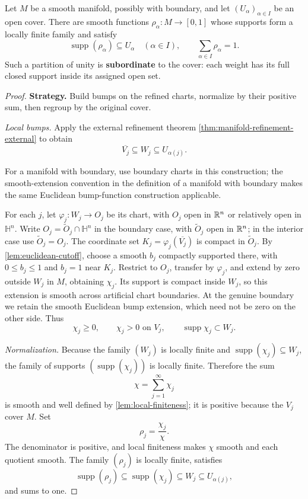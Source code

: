 \begin{theorem}
\label{thm:partition-unity}
Let $M$ be a smooth manifold, possibly with boundary, and let
$(U_\alpha)_{\alpha\in I}$ be an open cover. There are smooth functions
$\rho_\alpha:M\to[0,1]$ whose supports form a locally finite family and
satisfy
\[
\operatorname{supp}(\rho_\alpha)\subseteq U_\alpha
\quad(\alpha\in I),\qquad
\sum_{\alpha\in I}\rho_\alpha=1.
\]
Such a partition of unity is \textbf{subordinate} to the cover: each
weight has its full closed support inside its assigned open set.
\end{theorem}
\begin{proof}
\textbf{Strategy.} Build bumps on the refined charts, normalize by their
positive sum, then regroup by the original cover.

\emph{Local bumps.} Apply the external refinement theorem
\cref{thm:manifold-refinement-external} to obtain
\[
\overline{V_j}\subseteq W_j\subseteq U_{\alpha(j)}.
\]

For a manifold with boundary, use boundary charts in this construction; the
smooth-extension convention in the definition of a manifold with boundary
makes the same Euclidean bump-function construction applicable.

For each $j$, let $\varphi_j:W_j\to O_j$ be its chart, with $O_j$
open in $\mathbb{R}^n$ or relatively open in $\mathbb H^n$. Write
$O_j=\widetilde O_j\cap\mathbb H^n$ in the boundary case, with
$\widetilde O_j$ open in $\mathbb{R}^n$; in the interior case use $\widetilde O_j=O_j$.
The coordinate set $K_j=\varphi_j(\overline{V_j})$ is compact in
$\widetilde O_j$. By \cref{lem:euclidean-cutoff}, choose a smooth
$b_j$ compactly supported there, with $0\leq b_j\leq1$ and $b_j=1$
near $K_j$.
Restrict to $O_j$, transfer by $\varphi_j$, and extend by zero outside
$W_j$ in $M$, obtaining $\chi_j$. Its support is compact inside $W_j$,
so this extension is smooth across artificial chart boundaries. At the
genuine boundary we retain the smooth Euclidean bump extension, which need
not be zero on the other side. Thus
\[
\chi_j\geq0,\qquad\chi_j>0\text{ on }V_j,\qquad
\operatorname{supp}\chi_j\subset W_j.
\]

\emph{Normalization.} Because the family \((W_j)\) is locally finite and
\(\operatorname{supp}(\chi_j)\subseteq W_j\), the family of supports
\((\operatorname{supp}(\chi_j))\) is locally finite.  Therefore the sum
\[
\chi=\sum_{j=1}^{\infty}\chi_j
\]
is smooth and well defined by \cref{lem:local-finiteness}; it is positive because the
\(V_j\) cover \(M\).  Set
\[
\rho_j=\frac{\chi_j}{\chi}.
\]
The denominator is positive, and local finiteness makes \(\chi\) smooth and
each quotient smooth.  The family \((\rho_j)\) is locally finite, satisfies
\[
\operatorname{supp}(\rho_j)\subseteq\operatorname{supp}(\chi_j)
\subseteq W_j\subseteq U_{\alpha(j)},
\]
and sums to one.


\end{proof}
